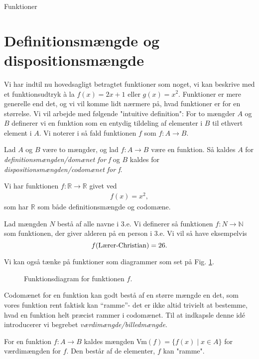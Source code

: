 \begin{center}
\Huge
Funktioner
\end{center}

\section*{Definitionsmængde og dispositionsmængde}

Vi har indtil nu hovedsagligt betragtet funktioner som noget, vi kan beskrive med et funktionsudtryk à la $f(x) = 2x+1$ eller $g(x) = x^2$. Funktioner er mere generelle end det, og vi vil komme lidt nærmere på, hvad funktioner er for en størrelse. Vi vil arbejde med følgende "intuitive definition": For to mængder $A$ og $B$ definerer vi en funktion som en entydig tildeling af elementer i $B$ til ethvert element i $A$. Vi noterer i så fald funktionen $f$ som $f:A \to B$. 
\begin{defn}
Lad $A$ og $B$ være to mængder, og lad $f:A \to B$ være en funktion. Så kaldes $A$ for \textit{definitionsmængden/domænet for f} og $B$ kaldes for \textit{dispositionsmængden/codomænet for f}.
\end{defn}
\begin{exa}
Vi har funktionen $f:\mathbb{R} \to \mathbb{R}$ givet ved 
\begin{align*}
f(x) = x^2,
\end{align*}
som har $\mathbb{R}$ som både definitionsmængde og codomæne.
\end{exa}

\begin{exa}\label{exa:navne}
Lad mængden $N$ bestå af alle navne i 3.e. Vi definerer så funktionen $f:N\to \mathbb{N}$ som funktionen, der giver alderen på en person i 3.e. Vi vil så have eksempelvis
$$f(\textnormal{Lærer-Christian}) = 26.$$
\end{exa}
Vi kan også tænke på funktioner som diagrammer som set på Fig. \ref{fig:diag}.
\begin{figure}[H]
	\centering
	\caption{Funktionsdiagram for funktionen $f$.}
	\label{fig:diag}
\end{figure}

Codomænet for en funktion kan godt bestå af en større mængde en det, som vores funktion rent faktisk kan ``ramme''- det er ikke altid trivielt at bestemme, hvad en funktion helt præcist rammer i codomænet. Til at indkapsle denne idé introducerer vi begrebet \textit{værdimængde/billedmængde}.
\begin{defn}[Værdimængde]
For en funktion $f:A \to B$ kaldes mængden Vm$(f) = \{f(x) \mid x \in A\}$ for værdimængden for $f$. Den består af de elementer, $f$ kan "ramme".
\end{defn}

